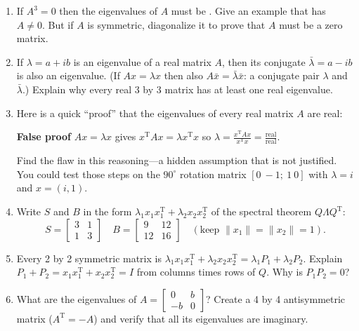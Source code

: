 \documentclass[14pt, a4paper]{article}
\begin{document}
\begin{enumerate}
    \item If $A^3 = 0$ then the eigenvalues of $A$ must be \underline{\hspace{1cm}}. Give an example that has $A \neq 0$. But if $A$ is symmetric, diagonalize it to prove that $A$ must be a zero matrix.

    \item If $\lambda = a + ib$ is an eigenvalue of a real matrix $A$, then its conjugate $\bar{\lambda} = a - ib$ is also an eigenvalue. (If $Ax = \lambda x$ then also $A\bar{x} = \bar{\lambda}\bar{x}$: a conjugate pair $\lambda$ and $\bar{\lambda}$.) Explain why every real 3 by 3 matrix has at least one real eigenvalue.

    \item Here is a quick ``proof'' that the eigenvalues of every real matrix $A$ are real:
          \begin{center}
              \textbf{False proof} \quad $Ax = \lambda x$ \quad gives \quad $x^{\mathrm{T}}Ax = \lambda x^{\mathrm{T}}x$ \quad so \quad $\lambda = \frac{x^{\mathrm{T}}Ax}{x^{\mathrm{T}}x} = \frac{\text{real}}{\text{real}}$.
          \end{center}
          Find the flaw in this reasoning—a hidden assumption that is not justified. You could test those steps on the $90^\circ$ rotation matrix $[0 \ -1; \ 1 \ 0]$ with $\lambda = i$ and $x = (i, 1)$.

    \item Write $S$ and $B$ in the form $\lambda_1 x_1 x_1^{\mathrm{T}} + \lambda_2 x_2 x_2^{\mathrm{T}}$ of the spectral theorem $Q\Lambda Q^{\mathrm{T}}$:
          \[
              S = \begin{bmatrix} 3 & 1 \\ 1 & 3 \end{bmatrix} \quad B = \begin{bmatrix} 9 & 12 \\ 12 & 16 \end{bmatrix} \quad (\text{keep } \|x_1\| = \|x_2\| = 1).
          \]

    \item Every 2 by 2 symmetric matrix is $\lambda_1 x_1 x_1^{\mathrm{T}} + \lambda_2 x_2 x_2^{\mathrm{T}} = \lambda_1 P_1 + \lambda_2 P_2$. Explain $P_1 + P_2 = x_1 x_1^{\mathrm{T}} + x_2 x_2^{\mathrm{T}} = I$ from columns times rows of $Q$. Why is $P_1 P_2 = 0$?

    \item What are the eigenvalues of $A = \begin{bmatrix} 0 & b \\ -b & 0 \end{bmatrix}$? Create a 4 by 4 antisymmetric matrix ($A^{\mathrm{T}} = -A$) and verify that all its eigenvalues are imaginary.


\end{enumerate}
\end{document}
